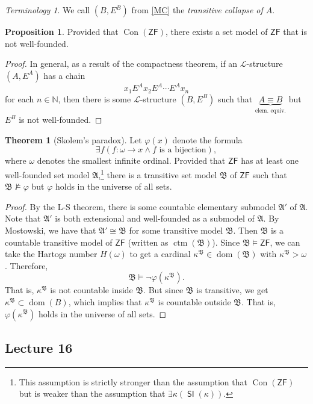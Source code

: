 \documentclass[10pt,letterpaper,cm]{nupset}
\theoremstyle{definition}
\theoremstyle{theorem}
\newtheorem{theorem}[definition]{Theorem}
\newtheorem{prop}[definition]{Proposition}
\theoremstyle{remark}
\newtheorem*{term}{Terminology}
\newcommand{\A}{\mathfrak A}
\renewcommand{\L}{\mathcal L}
\newcommand{\N}{\mathbb N}
\newcommand{\B}{\mathfrak{B}}
\newcommand{\1}{\mathbf{1}}
\newcommand{\0}{\vec 0}
\newcommand{\zf}{\mathsf{ZF}}
\DeclareMathOperator{\dom}{dom}
\DeclareMathOperator{\si}{\mathsf{SI}}
\DeclareMathOperator{\con}{Con}
\DeclareMathOperator{\ctm}{ctm}
\begin{document}
\begin{term}
We call $\left(B, E^B\right)$ from \cref{MC} the \textit{transitive collapse of $A$}.
\end{term}

\begin{prop}
Provided that $\con(\zf)$, there exists a set model of $\zf$ that is not well-founded.
\end{prop}
\begin{proof}
In general, as a result of the compactness theorem, if an $\L$-structure $(A, E^A)$ has a chain $$x_1{E^A}x_2{E^A}\cdots {E^A}x_n$$ for each $n\in \N$, then there is some $\L$-structure $(B, E^B)$ such that   $\underbrace{A\equiv B}_{\text{elem. equiv.}}$ but $E^B$ is not well-founded.
\end{proof}

\begin{theorem}[Skolem's paradox]
Let $\varphi(x)$ denote the formula $$\exists f(f : \omega  \to  x \land f \text{ is a bijection})  ,  $$ where $\omega$ denotes the smallest infinite ordinal. Provided that $\zf$ has at least one well-founded set model $\A$,\footnote{This assumption is strictly stronger than the assumption that $\con(\zf)$ but is weaker than the assumption that $\exists \kappa(\si(\kappa))$.} there is a transitive set model $\B$ of $\zf$ such that $\B \nvDash \varphi$ but $\varphi$ holds in the universe of all sets.
\end{theorem}
\begin{proof}
By the L-S theorem, there is some countable elementary submodel $\A'$ of $\A$. Note that $\A'$ is both extensional and well-founded as a submodel of $\A$. By Mostowski, we have that $\A' \cong \B$ for some transitive model $\B$. Then $\B$ is a countable transitive model of $\zf$ (written as $\ctm(\B)$). Since $\B \models \zf$, we can take the Hartogs number $H(\omega)$ to get a cardinal $\kappa^{\B} \in \dom(\B)$ with $\kappa^{\B} > \omega$. Therefore, $$\B \models \neg{\varphi(\kappa^{\B})}.$$ That is, $\kappa^{\B}$ is not countable inside $\B$. But since $\B$ is transitive, we get $\kappa^{\B} \subset \dom(B)$, which implies that $\kappa^{\B}$ is countable outside $\B$. That is, $\varphi(\kappa^{\B})$ holds in the universe of all sets.
\end{proof}

\subsection{Lecture 16}
\end{document}
